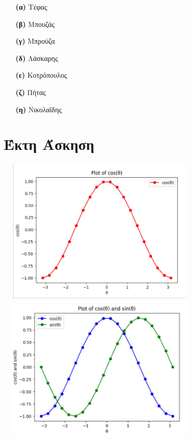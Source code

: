 \documentclass{article}
\begin{document}
\begin{itemize}
\item[\textbf{(α)}] Τέφας
\item[\textbf{(β)}] Μπουζάς
\item[\textbf{(γ)}] Μπρούζα
\item[\textbf{(δ)}] Λάσκαρης
\item[\textbf{(ε)}] Κοτρόπουλος
\item[\textbf{(ζ)}] Πήτας
\item[\textbf{(η)}] Νικολαΐδης
\end{itemize}

\section{Έκτη Άσκηση}
\begin{center}
\includegraphics[width=10cm, height=7cm]{cos graph.png} \\
\includegraphics[width=10cm, height=7cm]{cos and sin graph.png}
\end{center}
\end{document}

